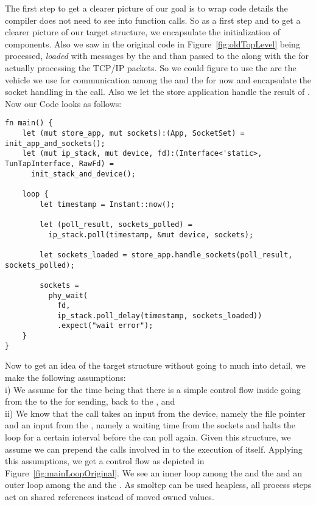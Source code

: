 The first step to get a clearer picture of our goal is to wrap code details the compiler does not need to see into function calls. So as a first step and to get a clearer picture of our target structure, we encapsulate the initialization of components. Also we saw in the original code in Figure~\ref{fig:oldTopLevel}  being processed, \emph{loaded} with messages by the  and than passed to the  along with the  for actually processing the TCP/IP packets. So we could figure to use the  are the vehicle we use for communication among the  and the  for now and encapsulate the socket handling in the  call. Also we let the store application handle the result of . 
Now our Code looks as follows:

\begin{verbatim}
fn main() {
    let (mut store_app, mut sockets):(App, SocketSet) = init_app_and_sockets();
    let (mut ip_stack, mut device, fd):(Interface<'static>, TunTapInterface, RawFd) = 
      init_stack_and_device();

    loop {
        let timestamp = Instant::now();
        
        let (poll_result, sockets_polled) = 
          ip_stack.poll(timestamp, &mut device, sockets);

        let sockets_loaded = store_app.handle_sockets(poll_result, sockets_polled);

        sockets = 
          phy_wait(
            fd, 
            ip_stack.poll_delay(timestamp, sockets_loaded))
            .expect("wait error");
    }
}
\end{verbatim}

Now to get an idea of the target structure without going to much into detail, we make the following assumptions: \\
i) We assume for the time being that there is a simple control flow inside  going from the  to the  for sending, back to the , and\\
ii) We know that the  call takes an input from the device, namely the file pointer  and an input from the , namely a waiting time from the sockets and halts the loop for a certain interval before the  can poll again. Given this structure, we assume we can prepend the calls involved in  to the execution of  itself. 
Applying this assumptions, we get a control flow as depicted in Figure~\ref{fig:mainLoopOriginal}. We see an inner loop among the  and the  and an outer loop among the  and the . As smoltcp can be used heapless, all process steps act on shared references instead of moved owned values.

